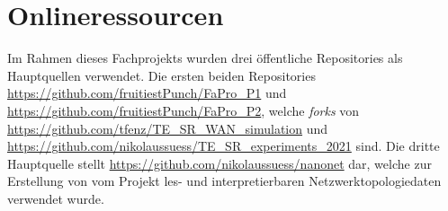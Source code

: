 \documentclass[sigconf, nonacm, review]{acmart}
\begin{document}
\appendix
\section{Onlineressourcen}
\label{sec:resouces}
Im Rahmen dieses Fachprojekts wurden drei \"offentliche Repositories als Hauptquellen verwendet. Die ersten beiden Repositories\newline
\url{https://github.com/fruitiestPunch/FaPro_P1} und \newline
\url{https://github.com/fruitiestPunch/FaPro_P2}, welche \emph{forks} von\newline
\url{https://github.com/tfenz/TE_SR_WAN_simulation} und \newline
\url{https://github.com/nikolaussuess/TE_SR_experiments_2021}\newline
sind. Die dritte Hauptquelle stellt \url{https://github.com/nikolaussuess/nanonet} dar, welche zur Erstellung von vom Projekt les- und interpretierbaren Netzwerktopologiedaten verwendet wurde.

\end{document}
